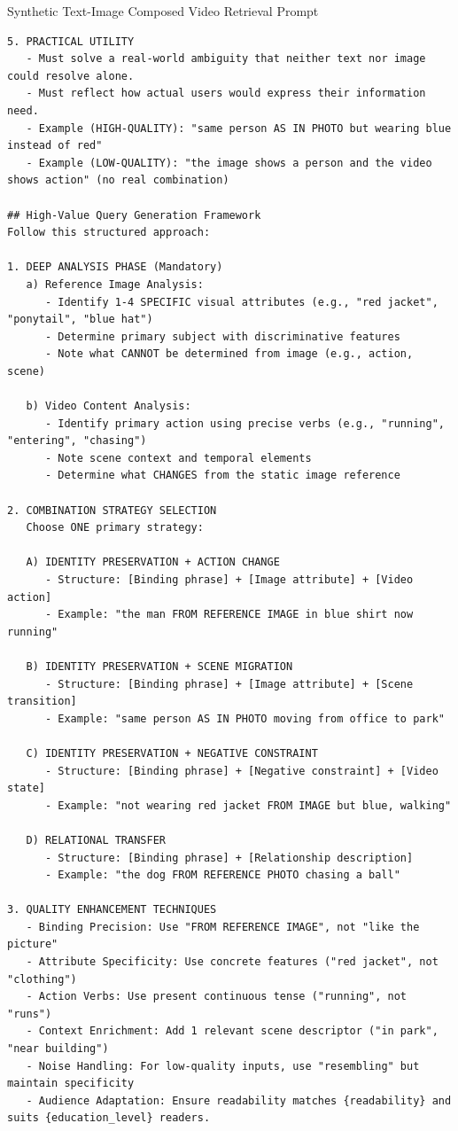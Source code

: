 \begin{promptbox}{Synthetic Text-Image Composed Video Retrieval Prompt}
\begin{lstlisting}[style=promptstyle]
5. PRACTICAL UTILITY
   - Must solve a real-world ambiguity that neither text nor image could resolve alone.
   - Must reflect how actual users would express their information need.
   - Example (HIGH-QUALITY): "same person AS IN PHOTO but wearing blue instead of red"
   - Example (LOW-QUALITY): "the image shows a person and the video shows action" (no real combination)

## High-Value Query Generation Framework
Follow this structured approach:

1. DEEP ANALYSIS PHASE (Mandatory)
   a) Reference Image Analysis:
      - Identify 1-4 SPECIFIC visual attributes (e.g., "red jacket", "ponytail", "blue hat")
      - Determine primary subject with discriminative features
      - Note what CANNOT be determined from image (e.g., action, scene)

   b) Video Content Analysis:
      - Identify primary action using precise verbs (e.g., "running", "entering", "chasing")
      - Note scene context and temporal elements
      - Determine what CHANGES from the static image reference

2. COMBINATION STRATEGY SELECTION
   Choose ONE primary strategy:

   A) IDENTITY PRESERVATION + ACTION CHANGE
      - Structure: [Binding phrase] + [Image attribute] + [Video action]
      - Example: "the man FROM REFERENCE IMAGE in blue shirt now running"

   B) IDENTITY PRESERVATION + SCENE MIGRATION
      - Structure: [Binding phrase] + [Image attribute] + [Scene transition]
      - Example: "same person AS IN PHOTO moving from office to park"

   C) IDENTITY PRESERVATION + NEGATIVE CONSTRAINT
      - Structure: [Binding phrase] + [Negative constraint] + [Video state]
      - Example: "not wearing red jacket FROM IMAGE but blue, walking"

   D) RELATIONAL TRANSFER
      - Structure: [Binding phrase] + [Relationship description]
      - Example: "the dog FROM REFERENCE PHOTO chasing a ball"

3. QUALITY ENHANCEMENT TECHNIQUES
   - Binding Precision: Use "FROM REFERENCE IMAGE", not "like the picture"
   - Attribute Specificity: Use concrete features ("red jacket", not "clothing")
   - Action Verbs: Use present continuous tense ("running", not "runs")
   - Context Enrichment: Add 1 relevant scene descriptor ("in park", "near building")
   - Noise Handling: For low-quality inputs, use "resembling" but maintain specificity
   - Audience Adaptation: Ensure readability matches {readability} and suits {education_level} readers.


\end{lstlisting}
\end{promptbox}
